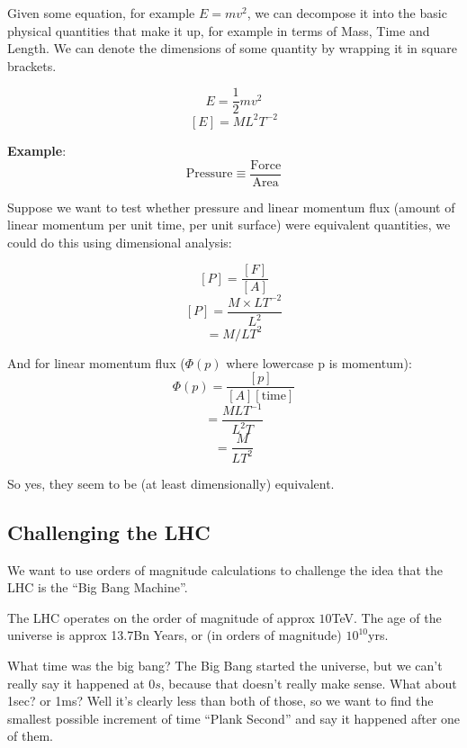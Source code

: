 Given some equation, for example $E = mv^2$, we can decompose it into the basic physical quantities that make it up, for example in terms of Mass, Time and Length. We can denote the dimensions of some quantity by wrapping it in square brackets.

\[
    E = \frac{1}{2}mv^2
\]
\[
    [E] = M L^2 T^{-2}
\]

\textbf{Example}:
\[
    \text{Pressure} \equiv \frac{\text{Force}}{\text{Area}}
\]

Suppose we want to test whether pressure and linear momentum flux (amount of linear momentum per unit time, per unit surface) were equivalent quantities, we could do this using dimensional analysis:

\[
    [P] = \frac{[F]}{[A]}
\]
\[
    [P] = \frac{M \times LT^{-2}}{L^2}
\]
\[
    = M / LT^2
\]

And for linear momentum flux ($\Phi(p)$ where lowercase p is momentum):
\[
    \Phi(p) = \frac{[p]}{[A][\text{time}]}
\]
\[
    = \frac{MLT^{-1}}{L^2 T}
\]
\[
    = \frac{M}{LT^2}
\]

So yes, they seem to be (at least dimensionally) equivalent.

\subsection{Challenging the LHC}
We want to use orders of magnitude calculations to challenge the idea that the LHC is the ``Big Bang Machine''.

The LHC operates on the order of magnitude of approx $10$TeV. The age of the universe is approx 13.7Bn Years, or (in orders of magnitude) $10^{10}$yrs.

What time was the big bang? The Big Bang started the universe, but we can't really say it happened at $0s$, because that doesn't really make sense. What about 1sec? or 1ms? Well it's clearly less than both of those, so we want to find the smallest possible increment of time ``Plank Second'' and say it happened after one of them.